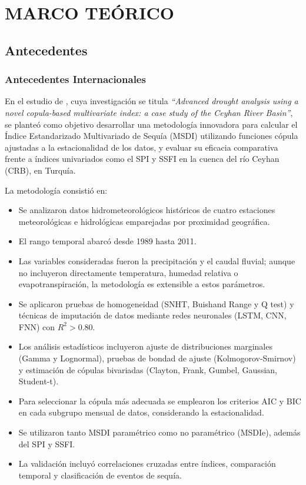 \chapter{MARCO TEÓRICO}
\section{Antecedentes}
\subsection{Antecedentes Internacionales}


En el estudio de \textcite{Terzi2025}, cuya investigación se titula \textit{“Advanced drought analysis using a novel copula-based multivariate index: a case study of the Ceyhan River Basin”}, se planteó como objetivo desarrollar una metodología innovadora para calcular el Índice Estandarizado Multivariado de Sequía (MSDI) utilizando funciones cópula ajustadas a la estacionalidad de los datos, y evaluar su eficacia comparativa frente a índices univariados como el SPI y SSFI en la cuenca del río Ceyhan (CRB), en Turquía.

La metodología consistió en:
\begin{itemize}
    \item Se analizaron datos hidrometeorológicos históricos de cuatro estaciones meteorológicas e hidrológicas emparejadas por proximidad geográfica.
    \item El rango temporal abarcó desde 1989 hasta 2011.
    \item Las variables consideradas fueron la precipitación y el caudal fluvial; aunque no incluyeron directamente temperatura, humedad relativa o evapotranspiración, la metodología es extensible a estos parámetros.
    \item Se aplicaron pruebas de homogeneidad (SNHT, Buishand Range y Q test) y técnicas de imputación de datos mediante redes neuronales (LSTM, CNN, FNN) con $R^2 > 0.80$.
    \item Los análisis estadísticos incluyeron ajuste de distribuciones marginales (Gamma y Lognormal), pruebas de bondad de ajuste (Kolmogorov-Smirnov) y estimación de cópulas bivariadas (Clayton, Frank, Gumbel, Gaussian, Student-t).
    \item Para seleccionar la cópula más adecuada se emplearon los criterios AIC y BIC en cada subgrupo mensual de datos, considerando la estacionalidad.
    \item Se utilizaron tanto MSDI paramétrico como no paramétrico (MSDIe), además del SPI y SSFI.
    \item La validación incluyó correlaciones cruzadas entre índices, comparación temporal y clasificación de eventos de sequía.
\end{itemize}

